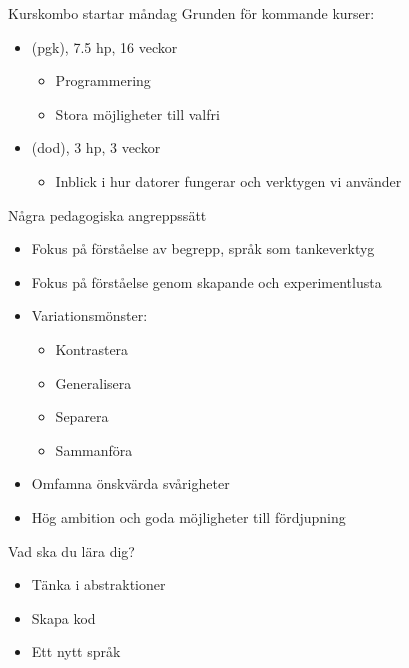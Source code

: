 \documentclass{lecturesimple}
\newcommand{\Startdag}{måndag}
\begin{document}
\begin{Slide}{Kurskombo startar \Startdag}
  Grunden för kommande kurser: \vspace{2em}
  \begin{itemize}
    \item {} (pgk), 7.5 hp, 16 veckor
    \begin{itemize}
      \item Programmering 
      \item Stora möjligheter till valfri 
    \end{itemize}
    \item {} (dod), 3 hp, 3 veckor
    \begin{itemize}
      \item Inblick i hur datorer fungerar och verktygen vi använder
    \end{itemize}
  \end{itemize}
\end{Slide}

\begin{Slide}{Några pedagogiska angreppssätt}
  \begin{itemize}
    \item Fokus på förståelse av begrepp, språk som tankeverktyg 
    \item Fokus på förståelse genom skapande och experimentlusta
    \item Variationsmönster: \pause
    \begin{itemize}
      \item Kontrastera
      \item Generalisera
      \item Separera
      \item Sammanföra
    \end{itemize} \pause
    \item Omfamna önskvärda svårigheter
    \item Hög ambition och goda möjligheter till fördjupning
  \end{itemize}
\end{Slide}

\begin{Slide}{Vad ska du lära dig?}
  \begin{itemize}
    \item Tänka i abstraktioner
    \item Skapa kod
    \item Ett nytt språk
  \end{itemize}
\end{Slide}
\end{document}
